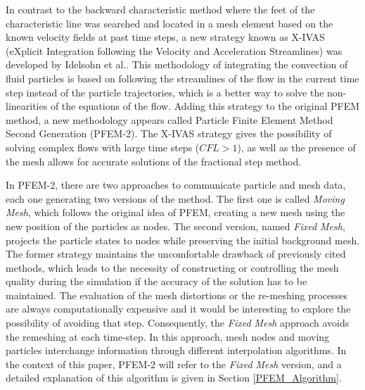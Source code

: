In contrast to the backward characteristic method where the feet of the characteristic line was searched and located in a mesh element based on the known velocity fields at past time steps, a new strategy known as X-IVAS (eXplicit Integration following the Velocity and Acceleration Streamlines) was developed by Idelsohn et al.\cite{Idelsohn12}. This methodology of integrating the convection of fluid particles is based on following the streamlines of the flow in the current time step instead of the particle trajectories, which is a better way to solve the non-linearities of the equations of the flow. Adding this strategy to the original PFEM method, a new methodology appears called Particle Finite Element Method Second Generation (PFEM-2)\cite{Idelsohn12b}. The X-IVAS strategy gives the possibility of solving complex flows with large time steps ($CFL>1$), as well as the presence of the mesh allows for accurate solutions of the fractional step method.

In PFEM-2, there are two approaches to communicate particle and mesh data, each one generating two versions of the method. The first one is called \textit{Moving Mesh}, which follows the original idea of PFEM, creating a new mesh using the new position of the particles as nodes. The second version, named \textit{Fixed Mesh}, projects the particle states to nodes while preserving the initial background mesh. The former strategy maintains the uncomfortable drawback of previously cited methods, which leads to the necessity of constructing or controlling the mesh quality during the simulation if the accuracy of the solution has to be maintained. The evaluation of the mesh distortions or the re-meshing processes are always computationally expensive and it would be interesting to explore the possibility of avoiding that step. Consequently, the \textit{Fixed Mesh} approach avoids the remeshing at each time-step. In this approach, mesh nodes and moving particles interchange information through different interpolation algorithms. In the context of this paper, PFEM-2 will refer to the \textit{Fixed Mesh} version, and a detailed explanation of this algorithm is given in Section \ref{PFEM_Algorithm}.

